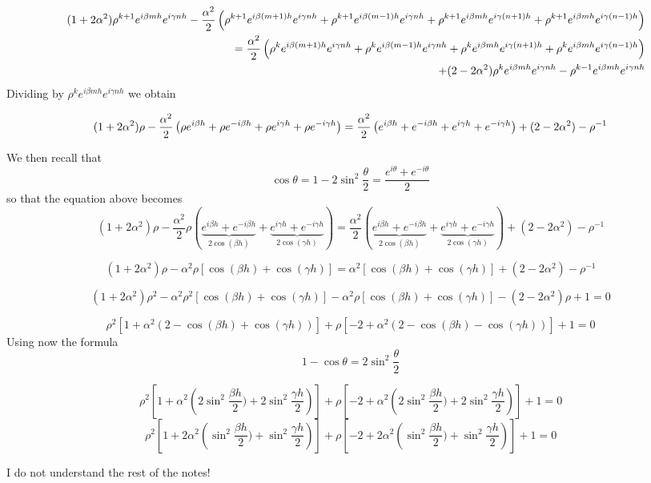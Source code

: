 \begin{eqnarray}
&&(1+2\alpha^2) \rho^{k+1} e^{i\beta mh}e^{i \gamma n h} 
-\frac{\alpha^2}{2} \left( 
 \rho^{k+1} e^{i\beta (m+1)h}e^{i \gamma n h}
+\rho^{k+1} e^{i\beta (m-1)h}e^{i \gamma n h}
+\rho^{k+1} e^{i\beta mh}e^{i \gamma (n+1) h}
+\rho^{k+1} e^{i\beta mh}e^{i \gamma (n-1) h}
\right) \nonumber\\
&&=
\frac{\alpha^2}{2} \left( 
 \rho^{k} e^{i\beta (m+1)h}e^{i \gamma n h}
+\rho^{k} e^{i\beta (m-1)h}e^{i \gamma n h}
+\rho^{k} e^{i\beta mh}e^{i \gamma (n+1) h}
+\rho^{k} e^{i\beta mh}e^{i \gamma (n-1) h}
\right) \nonumber\\
&&+(2-2\alpha^2) \rho^k e^{i\beta mh}e^{i \gamma n h} -\rho^{k-1} e^{i\beta mh}e^{i \gamma n h}  \nonumber
\end{eqnarray}
Dividing by $\rho^k e^{i\beta mh}e^{i \gamma n h}$ we obtain

\[
(1+2\alpha^2) \rho  
-\frac{\alpha^2}{2} \left( 
 \rho e^{i\beta h}
+\rho e^{-i\beta h}
+\rho e^{i \gamma  h}
+\rho e^{-i \gamma  h}
\right) =
\frac{\alpha^2}{2} \left( 
  e^{i\beta h}
+ e^{-i\beta h}
+ e^{i \gamma  h}
+ e^{-i \gamma  h}
\right) 
+(2-2\alpha^2)  -\rho^{-1}   \nonumber
\]

We then recall that 
\[
\cos \theta
=
1 -2 \sin^2 \frac{\theta}{2}
=
\frac{e^{i\theta}+e^{-i\theta}}{2}
\]
so that the equation above becomes
\[
(1+2\alpha^2) \rho  
-\frac{\alpha^2}{2} \rho\left( 
\underbrace{ e^{i\beta h} + e^{-i\beta h}}_{2 \cos (\beta h)}
+ \underbrace{e^{i \gamma  h}+ e^{-i \gamma  h} }_{2 \cos ( \gamma h)}
\right) =
\frac{\alpha^2}{2} \left( 
\underbrace{  e^{i\beta h} + e^{-i\beta h} }_{2 \cos (\beta h)}
+ \underbrace{ e^{i \gamma  h} + e^{-i \gamma  h} }_{2 \cos( \gamma h)}
\right) 
+(2-2\alpha^2)  -\rho^{-1} 
\]

\[
(1+2\alpha^2) \rho  
-\alpha^2 \rho\left[ \cos (\beta h)  +\cos (\gamma h) \right] =
\alpha^2 \left[ \cos (\beta h) + \cos(\gamma h) \right] 
+(2-2\alpha^2)  -\rho^{-1} 
\]


\[
(1+2\alpha^2) \rho^2  
-\alpha^2 \rho^2 \left[ \cos (\beta h)  +\cos (\gamma h) \right] 
-\alpha^2 \rho \left[ \cos (\beta h) + \cos(\gamma h) \right] 
-(2-2\alpha^2)\rho  +1 =0 
\]

\[
\rho^2 \left[
1 + \alpha^2 ( 2 - \cos (\beta h)  +\cos ( \gamma h) )
\right]
+\rho
\left[
-2 + \alpha^2 ( 2 - \cos (\beta h) - \cos( \gamma h) )
\right]
+1
=0
\]
Using now the formula 
\[
1-\cos \theta
=
2 \sin^2 \frac{\theta}{2}
\]


\[
\rho^2 \left[
1 + \alpha^2 \left( 2 \sin^2 \frac{\beta h}{2})  + 2 \sin^2  \frac{ \gamma h}{2} \right)
\right]
+\rho
\left[
-2 + \alpha^2 \left( 2\sin^2 \frac{\beta h}{2}) +  2\sin ^2 \frac{\gamma h}{2} \right)
\right]
+1
=0
\]
\[
\rho^2 \left[
1 + 2\alpha^2 \left(  \sin^2 \frac{\beta h}{2})  +  \sin^2  \frac{ \gamma h}{2} \right)
\right]
+\rho
\left[
-2 + 2\alpha^2 \left( \sin^2 \frac{\beta h}{2}) +  \sin ^2 \frac{\gamma h}{2} \right)
\right]
+1
=0
\]


I do not understand the rest of the notes!






